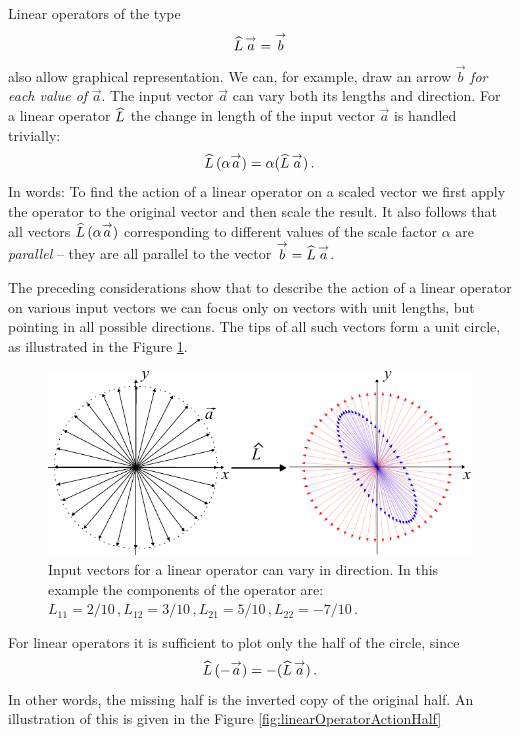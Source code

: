 Linear operators of the type
\[
\widehat{L}\,\overset{\rightarrow}{a} = \overset{\rightarrow}{b}
\]
also allow graphical representation. We can,
for example, draw an
arrow $\vec{b}$ \emph{for each value of} $\vec{a}$. The input vector
$\vec{a}$ can vary both its lengths and direction. For a linear
operator $\widehat{L}$ the change in length of the input vector $\vec{a}$
is handled trivially:
\[
\widehat{L}\,(\alpha \overset{\rightarrow}{a}) = \alpha (\widehat{L}\,\overset{\rightarrow}{a})\,.
\]
In words: To find the action of a linear operator on a scaled vector
we first apply the operator to the original vector and then scale the
result. It also follows that all vectors $\widehat{L}\,(\alpha \overset{\rightarrow}{a})$
corresponding to different values of the scale factor $\alpha$ are
\emph{parallel} -- they are all parallel to the vector
$\overset{\rightarrow}{b}=\widehat{L}\,\overset{\rightarrow}{a}$.

The preceding considerations show that to describe the action of a
linear operator on
various input vectors we can focus only on vectors with unit lengths,
but pointing in all possible directions. The tips of all such vectors
form a unit circle, as illustrated in the Figure
\ref{fig:linearOperatorAction}.
\begin{figure}[htbp]
  \centering
  \includegraphics[scale=1.0]{linearOperatorAction}
  \caption{Input vectors for a linear operator can vary in
    direction. In this example the components of the operator are:
    $L_{11}=2/10\,, L_{12}=3/10\,, L_{21}=5/10\,,L_{22}=-7/10\,.$}
  \label{fig:linearOperatorAction}
\end{figure}

For linear operators it is sufficient to plot only the half of the circle,
since
\[
\widehat{L}\,(-\overset{\rightarrow}{a}) = -(\widehat{L}\,\overset{\rightarrow}{a})\,.
\]
In other words, the missing half is the inverted copy of the original half.
An illustration of this is given in the Figure \ref{fig:linearOperatorActionHalf}

